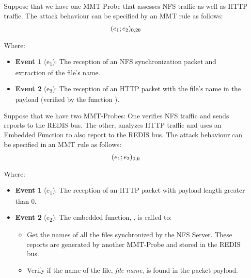  Suppose that we have one MMT-Probe that assesses NFS traffic as well as HTTP traffic. The attack behaviour can be specified by an MMT rule as follows:
\begin{displaymath} 
(e\textsubscript{1} ; e\textsubscript{2})\textsubscript{0,20}
\end{displaymath}


Where: 
\begin{itemize}
\item \textbf{Event 1} (e\textsubscript{1}): The reception of an NFS synchronization packet and extraction of the file\rq s name.
\item \textbf{Event 2} (e\textsubscript{2}): The reception of an HTTP packet with the file\rq s name in the payload (verified by the function ).  
\end{itemize}


 Suppose that we have two MMT-Probes: One verifies NFS traffic and sends reports to the REDIS bus. The other, analyzes HTTP traffic and uses an Embedded Function to also report to the REDIS bus. The attack behaviour can be specified in an MMT rule as follows:
\begin{displaymath} 
(e\textsubscript{1} ; e\textsubscript{2})\textsubscript{0,0}
\end{displaymath}



Where:
\begin{itemize}
\item \textbf{Event 1} (e\textsubscript{1}): The reception of an HTTP packet with payload length greater than 0.
\item \textbf{Event 2} (e\textsubscript{2}): The embedded function, , is called to:
\begin{itemize}
\item Get the names of all the files synchronized by the NFS Server. These reports are generated by another MMT-Probe and stored in the REDIS bus.   
\item Verify if the name of the file, \textit{file name}, is found in the packet payload. 
\end{itemize}
\end{itemize}



